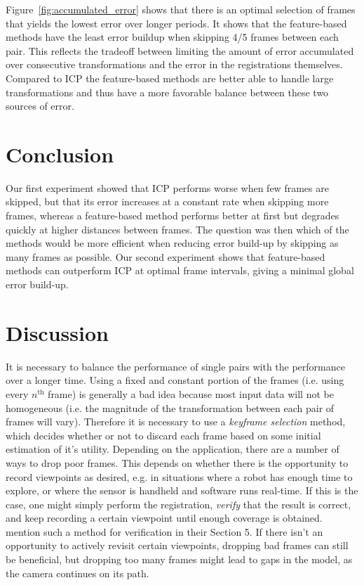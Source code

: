 \documentclass[a4paper]{article}
\begin{document}
Figure~\ref{fig:accumulated_error} shows that there is an optimal selection of frames that yields the lowest error over longer periods. It shows that the feature-based methods have the least error buildup when skipping 4/5 frames between each pair. This reflects the tradeoff between limiting the amount of error accumulated over consecutive transformations and the error in the registrations themselves. Compared to \ac{ICP} the feature-based methods are better able to handle large transformations and thus have a more favorable balance between these two sources of error.



\section{Conclusion}
Our first experiment showed that \ac{ICP} performs worse when few frames are skipped, but that its error increases at a constant rate when skipping more frames, whereas a feature-based method performs better at first but degrades quickly at higher distances between frames. The question was then which of the methods would be more efficient when reducing error build-up by skipping as many frames as possible. Our second experiment shows that feature-based methods can outperform \ac{ICP} at optimal frame intervals, giving a minimal global error build-up.

\section{Discussion}
It is necessary to balance the performance of single pairs with the performance over a longer time. Using a fixed and constant portion of the frames (i.e. using every $n^{\mathrm{th}}$ frame) is generally a bad idea because most input data will not be homogeneous (i.e. the magnitude of the transformation between each pair of frames will vary). Therefore it is necessary to use a \emph{keyframe selection} method, which decides whether or not to discard each frame based on some initial estimation of it's utility. Depending on the application, there are a number of ways to drop poor frames. This depends on whether there is the opportunity to record viewpoints as desired, e.g. in situations where a robot has enough time to explore, or where the sensor is handheld and software runs real-time. If this is the case, one might simply perform the registration, \emph{verify} that the result is correct, and keep recording a certain viewpoint until enough coverage is obtained. \cite{makadia2006fully} mention such a method for verification in their Section 5. If there isn't an opportunity to actively revisit certain viewpoints, dropping bad frames can still be beneficial, but dropping too many frames might lead to gaps in the model, as the camera continues on its path.
\end{document}
